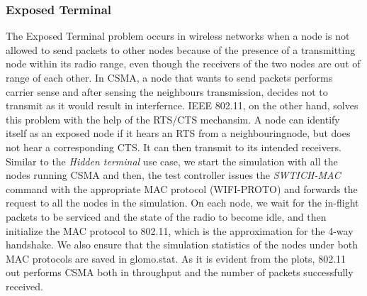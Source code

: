 \subsubsection{Exposed Terminal}
The Exposed Terminal problem occurs in wireless networks when a node is not allowed to send packets to other nodes because of the presence of a transmitting node within its radio range, even though the receivers of the two nodes are out of range of each other. In CSMA, a node that wants to send packets performs carrier sense and after sensing the neighbours transmission, decides not to transmit as it would result in interfernce. IEEE 802.11, on the other hand, solves this problem with the help of the RTS/CTS mechansim. A node can identify itself as an exposed node if it hears an RTS from a neighbouringnode, but does not hear a corresponding CTS. It can then transmit to its intended receivers. 
Similar to the \emph{Hidden terminal} use case, we start the simulation with all the nodes running CSMA and then, the test controller issues the \emph{SWTICH-MAC} command with the appropriate MAC protocol (WIFI-PROTO) and forwards the request to all the nodes in the simulation. On each node, we wait for the in-flight packets to be serviced and the state of the radio to become idle, and then initialize the MAC protocol to 802.11, which is the approximation for the 4-way handshake. We also ensure that the simulation statistics of the nodes under both MAC protocols are saved in glomo.stat. As it is evident from the plots, 802.11 out performs CSMA both in throughput and the number of packets successfully received.  
